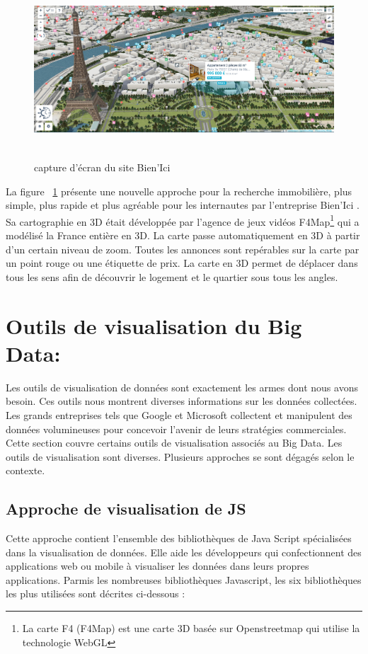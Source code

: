 \documentclass[french, a4paper, 12pt]{report}
\begin{document}
\begin{figure}[!ht]
    \centering
    \includegraphics[height=6.6cm]{images/bienIci.jpg}
    \caption{capture d'écran du site Bien’Ici }
    \label{fig:2.9}
\end{figure}
La figure ~\ref{fig:2.9} présente une nouvelle approche pour la recherche immobilière, plus simple, plus rapide et plus agréable pour les internautes par l’entreprise Bien’Ici . Sa cartographie en 3D était développée par l’agence de jeux vidéos F4Map\footnote{ La carte F4 (F4Map) est une carte 3D basée sur Openstreetmap qui utilise la technologie WebGL } qui a modélisé la France entière en 3D. La carte passe automatiquement en 3D à partir d’un certain niveau de zoom. Toutes les annonces sont repérables sur la carte par un point rouge ou une étiquette de prix.  La carte en 3D permet de déplacer dans tous les sens afin de découvrir le logement et le quartier sous tous les angles.

\section{Outils de visualisation du Big Data: }
Les outils de visualisation de données sont exactement les armes dont nous avons besoin. Ces outils nous montrent diverses informations sur les données collectées. Les grands entreprises tels que Google et Microsoft collectent et manipulent des données volumineuses pour concevoir l'avenir de leurs stratégies commerciales. Cette section couvre certains outils de visualisation associés au Big Data. Les outils de visualisation sont diverses.  Plusieurs approches se sont dégagés selon le contexte. \\

\subsection{Approche de visualisation de JS}
Cette approche contient l’ensemble des bibliothèques de Java Script spécialisées dans la visualisation de données. Elle aide les développeurs qui confectionnent des applications web ou mobile à visualiser les données dans leurs propres applications. 
Parmis les nombreuses bibliothèques Javascript, les six bibliothèques les plus utilisées sont décrites ci-dessous : 
\end{document}

